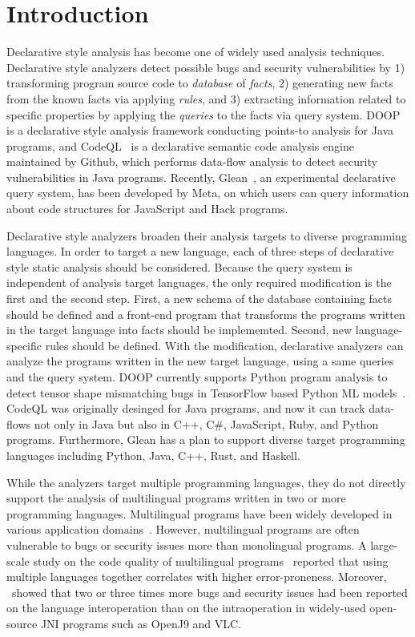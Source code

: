 \section{Introduction}
Declarative style analysis has become one of widely used analysis techniques.
Declarative style analyzers detect possible bugs and
security vulnerabilities by 1) transforming program source code to {\it database}
of {\it facts}, 2) generating new facts from the known facts via applying
{\it rules}, and 3) extracting information related to specific properties by
applying the {\it queries} to the facts via query system.  DOOP~\cite{doop} is a
declarative style analysis framework conducting points-to analysis for Java
programs, and CodeQL~\cite{codeql} is a declarative semantic code analysis engine
maintained by Github, which performs data-flow analysis to detect security
vulnerabilities in Java programs.  Recently, Glean~\cite{glean}, an experimental
declarative query system, has been developed by Meta, on which users can query
information about code structures for JavaScript and Hack programs.

Declarative style analyzers broaden their analysis targets to diverse
programming languages. In order to target a new language, each of three steps
of declarative style static analysis should be considered.  Because the query
system is independent of analysis target languages, the only required
modification is the first and the second step.  First, a new schema of the
database containing facts should be defined and a front-end program that
transforms the programs written in the target language into facts should be
implememted.  Second, new language-specific rules should be defined.  With the
modification, declarative analyzers can analyze the programs written in the new
target language, using a same queries and the query system.  DOOP currently
supports Python program analysis to detect tensor shape mismatching bugs in
TensorFlow based Python ML models~\cite{lagouvardos2020static}. CodeQL was
originally desinged for Java programs, and now it can track data-flows not only
in Java but also in C++, C\#, JavaScript, Ruby, and Python programs.
Furthermore, Glean has a plan to support diverse target programming languages
including Python, Java, C++, Rust, and Haskell.

While the analyzers target multiple programming languages, they do not directly
support the analysis of multilingual programs written in two or more
programming languages. Multilingual programs have been widely developed in
various application domains~\cite{kochhar2016large, mergendahlcross}. However,
multilingual programs are often vulnerable to bugs or security issues more than
monolingual programs. A large-scale study on the code quality of multilingual
programs~\cite{kochhar2016large} reported that using multiple languages
together correlates with higher error-proneness. Moreover,
\cite{grichi2020impact}~showed that two or three times more bugs and security
issues had been reported on the language interoperation than on the
intraoperation in widely-used open-source JNI programs such as OpenJ9 and VLC.

